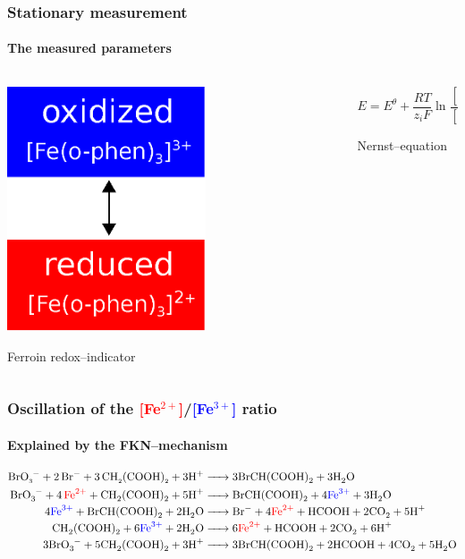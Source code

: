 \documentclass{beamer}
\begin{document}
\begin{frame}
\frametitle{Stationary measurement}
\framesubtitle{The measured parameters}
\begin{columns}[T] %
\begin{column}{.48\textwidth}

\centering
\includegraphics[width=0.6\textwidth]{ferroin.eps}

Ferroin redox--indicator

\end{column}%
\hfill%
\begin{column}{.48\textwidth}
\centering


\begin{equation*}
        E=E^\theta + \frac{RT}{z_iF} \ln \frac{[Fe^{3+}]}{[Fe^{2+}]}
\end{equation*}

Nernst--equation
\end{column}%
\end{columns}
\end{frame}

\begin{frame}
\frametitle{Oscillation of the \textcolor{red}{[Fe$^{2+}$]}/\textcolor{blue}{[Fe$^{3+}$]} ratio}
\framesubtitle{Explained by the FKN--mechanism}
\tiny
\begin{align}
\tiny
\ce {BrO3^- + 2Br- + 3CH2(COOH)2 + 3 H+ &-> 3 BrCH(COOH)2 + 3 H2O}\\
\ce {BrO3^- + 4\textcolor{red}{\ce {Fe^2+}} + CH2(COOH)2 + 5 H+ &-> BrCH(COOH)2 + 4 \textcolor{blue}{\ce {Fe^3+}} + 3 H2O}\\
\ce {4 \textcolor{blue}{\ce {Fe^3+}} + BrCH(COOH)2 + 2 H2O &-> Br- + 4 \textcolor{red}{\ce {Fe^2+}} + HCOOH + 2 CO2 + 5 H+}\\
\ce {CH2(COOH)2 + 6 \textcolor{blue}{\ce {Fe^3+}} + 2 H2O &-> 6 \textcolor{red}{\ce {Fe^2+}} + HCOOH + 2 CO2 + 6 H+}\\
\ce {3 BrO3^- + 5 CH2(COOH)2 + 3 H+ &-> 3 BrCH(COOH)2 + 2 HCOOH + 4 CO2 + 5 H2O}
\large
\end{align}
\large
\end{frame}
\end{document}
